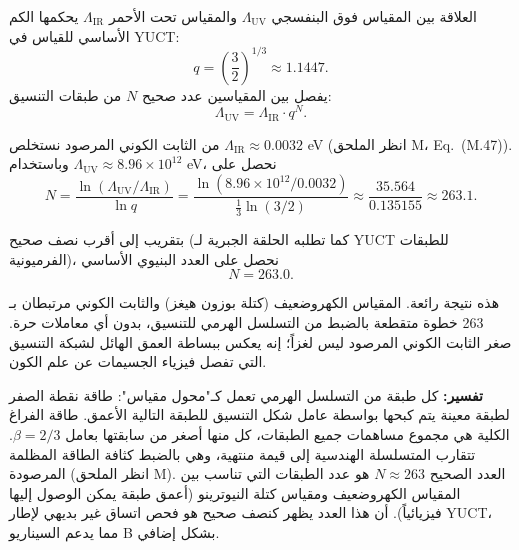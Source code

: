 \documentclass[11pt,a4paper]{article}
\newcommand{\LUV}{\Lambda_{\mathrm{UV}}}
\theoremstyle{remark}
\begin{document}
\begin{otherlanguage}{arabic}
		العلاقة بين المقياس فوق البنفسجي \(\LUV\) والمقياس تحت الأحمر \(\Lambda_{\mathrm{IR}}\) يحكمها الكم الأساسي للقياس في YUCT:
		\begin{equation}
			q = \left(\frac{3}{2}\right)^{1/3} \approx 1.1447.
		\end{equation}
		يفصل بين المقياسين عدد صحيح \(N\) من طبقات التنسيق:
		\begin{equation}
			\LUV = \Lambda_{\mathrm{IR}} \cdot q^{N}.
			\label{eq:bridge}
		\end{equation}
		
		من الثابت الكوني المرصود نستخلص \(\Lambda_{\mathrm{IR}} \approx 0.0032\) eV (انظر الملحق M، Eq.~(M.47)). وباستخدام \(\LUV \approx 8.96 \times 10^{12}\) eV، نحصل على
		\begin{equation}
			N = \frac{\ln(\LUV / \Lambda_{\mathrm{IR}})}{\ln q}
			= \frac{\ln(8.96 \times 10^{12} / 0.0032)}{\frac{1}{3}\ln(3/2)}
			\approx \frac{35.564}{0.135155} \approx 263.1.
			\label{eq:N_layers}
		\end{equation}
		
		بتقريب إلى أقرب نصف صحيح (كما تطلبه الحلقة الجبرية لـ YUCT للطبقات الفرميونية)، نحصل على العدد البنيوي الأساسي
		\begin{equation}
			\boxed{N = 263.0}.
		\end{equation}
		
		هذه نتيجة رائعة. المقياس الكهروضعيف (كتلة بوزون هيغز) والثابت الكوني مرتبطان بـ 263 خطوة متقطعة بالضبط من التسلسل الهرمي للتنسيق، بدون أي معاملات حرة. صغر الثابت الكوني المرصود ليس لغزاً؛ إنه يعكس ببساطة العمق الهائل لشبكة التنسيق التي تفصل فيزياء الجسيمات عن علم الكون.
		
		\textbf{تفسير:} كل طبقة من التسلسل الهرمي تعمل كـ"محول مقياس": طاقة نقطة الصفر لطبقة معينة يتم كبحها بواسطة عامل شكل التنسيق للطبقة التالية الأعمق. طاقة الفراغ الكلية هي مجموع مساهمات جميع الطبقات، كل منها أصغر من سابقتها بعامل \(\beta = 2/3\). تتقارب المتسلسلة الهندسية إلى قيمة منتهية، وهي بالضبط كثافة الطاقة المظلمة المرصودة (انظر الملحق M). العدد الصحيح \(N \approx 263\) هو عدد الطبقات التي تناسب بين المقياس الكهروضعيف ومقياس كتلة النيوترينو (أعمق طبقة يمكن الوصول إليها فيزيائياً). أن هذا العدد يظهر كنصف صحيح هو فحص اتساق غير بديهي لإطار YUCT، مما يدعم السيناريو B بشكل إضافي.
		

\end{otherlanguage}
\end{document}

